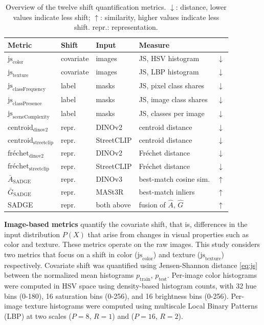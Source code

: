 \documentclass[conference]{IEEEtran}
\begin{document}
\begin{table}[!htbp]
    \centering
    \caption{Overview of the twelve shift quantification metrics. $\downarrow$: distance, lower values indicate less shift; $\uparrow$: similarity, higher values indicate less shift. repr.: representation.}
    \label{tab:metrics}
    \footnotesize
    \setlength{\tabcolsep}{3pt}
    \begin{tabular}{llllc}
        \hline
        Metric & Shift & Input & Measure & \\
        \hline
        $\text{js}_{\text{color}}$ & covariate & images & JS, HSV histogram & $\downarrow$ \\
        $\text{js}_{\text{texture}}$ & covariate & images & JS, LBP histogram & $\downarrow$ \\
        $\text{js}_{\text{classFrequency}}$ & label & masks & JS, pixel class shares & $\downarrow$ \\
        $\text{js}_{\text{classPresence}}$ & label & masks & JS, image class shares & $\downarrow$ \\
        $\text{js}_{\text{sceneComplexity}}$ & label & masks & JS, classes per image & $\downarrow$ \\
        $\text{centroid}_{\text{dinov2}}$ & repr. & DINOv2 & centroid distance & $\downarrow$ \\
        $\text{centroid}_{\text{streetclip}}$ & repr. & StreetCLIP & centroid distance & $\downarrow$ \\
        $\text{fréchet}_{\text{dinov2}}$ & repr. & DINOv2 & Fréchet distance & $\downarrow$ \\
        $\text{fréchet}_{\text{streetclip}}$ & repr. & StreetCLIP & Fréchet distance & $\downarrow$ \\
        $\bar{A}_{\text{SADGE}}$ & repr. & DINOv3 & best-match cosine sim. & $\uparrow$ \\
        $\bar{G}_{\text{SADGE}}$ & repr. & MASt3R & best-match inliers & $\uparrow$ \\
        SADGE & repr. & both above & fusion of $\hat{A}$, $\hat{G}$ & $\uparrow$ \\
        \hline
    \end{tabular}
\end{table}

\textbf{Image-based metrics} quantify the covariate shift, that is, differences in the input distribution $P(X)$ that arise from changes in visual properties such as color and texture. These metrics operate on the raw images. This study considers two metrics that focus on a shift in color ($\text{js}_{\text{color}}$) and texture ($\text{js}_{\text{texture}}$) respectively. Covariate shift was quantified using Jensen-Shannon distance \eqref{eq:js} between the normalized mean histograms $p_{\text{train}}$, $p_{\text{test}}$. Per-image color histograms were computed in HSV space using density-based histogram counts, with 32 hue bins (0-180), 16 saturation bins (0-256), and 16 brightness bins (0-256). Per-image texture histograms were computed using multiscale Local Binary Patterns (LBP) at two scales ($P=8$, $R=1$) and ($P=16$, $R=2$).
\end{document}
